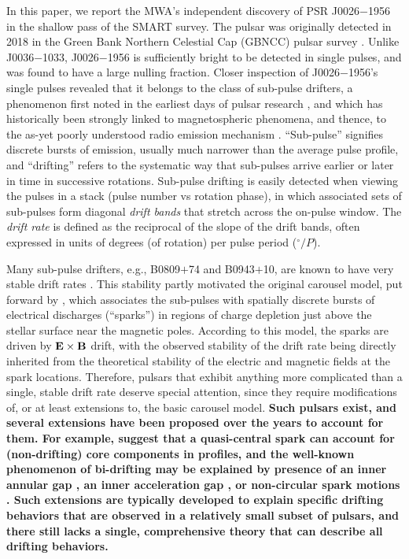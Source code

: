\documentclass[linenumbers]{aastex631}
\newcommand{\psr}{J0026$-$1956}
\newcommand{\psrnick}{J0036$-$1033}
\newcommand{\ExB}{\ensuremath{{\bf E}\times{\bf B}}}
\begin{document}
In this paper, we report the MWA's independent discovery of PSR \psr{} in the shallow pass of the SMART survey.
The pulsar was originally detected in 2018 in the Green Bank Northern Celestial Cap (GBNCC) pulsar survey \citep{Stovall2014}.
Unlike \psrnick{}, \psr{} is sufficiently bright to be detected in single pulses, and was found to have a large nulling fraction.
Closer inspection of \psr{}'s single pulses revealed that it belongs to the class of sub-pulse drifters, a phenomenon first noted in the earliest days of pulsar research \citep{Drake1968}, and which has historically been strongly linked to magnetospheric phenomena, and thence, to the as-yet poorly understood radio emission mechanism \citep{Ruderman1975,Rankin1986,Deshpande1999,McSweeney2019a}.
``Sub-pulse'' signifies discrete bursts of emission, usually much narrower than the average pulse profile, and ``drifting'' refers to the systematic way that sub-pulses arrive earlier or later in time in successive rotations.
Sub-pulse drifting is easily detected when viewing the pulses in a stack (pulse number vs rotation phase), in which associated sets of sub-pulses form diagonal \textit{drift bands} that stretch across the on-pulse window.
The \textit{drift rate} is defined as the reciprocal of the slope of the drift bands, often expressed in units of degrees (of rotation) per pulse period ($^\circ/P$).

Many sub-pulse drifters, e.g., B0809$+$74 and B0943$+$10, are known to have very stable drift rates \citep[e.g.][]{Taylor1971,Deshpande1999}.
This stability partly motivated the original carousel model, put forward by \citet{Ruderman1975}, which associates the sub-pulses with spatially discrete bursts of electrical discharges (``sparks'') in regions of charge depletion just above the stellar surface near the magnetic poles.
According to this model, the sparks are driven by \ExB{} drift, with the observed stability of the drift rate being directly inherited from the theoretical stability of the electric and magnetic fields at the spark locations.
Therefore, pulsars that exhibit anything more complicated than a single, stable drift rate deserve special attention, since they require modifications of, or at least extensions to, the basic carousel model.
{\bf
Such pulsars exist, and several extensions have been proposed over the years to account for them.
For example, \citet{Gil2000} suggest that a quasi-central spark can account for (non-drifting) core components in profiles, and the well-known phenomenon of bi-drifting may be explained by presence of an inner annular gap \citep{Qiao2004}, an inner acceleration gap \citep{Basu2020}, or non-circular spark motions \citep{Wright2017}.
Such extensions are typically developed to explain specific drifting behaviors that are observed in a relatively small subset of pulsars, and there still lacks a single, comprehensive theory that can describe all drifting behaviors.
}
\end{document}
